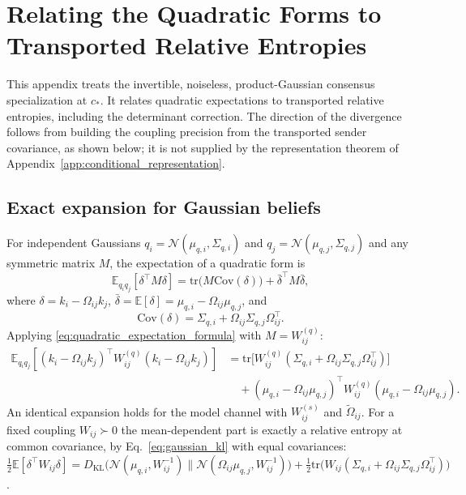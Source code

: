 \section{Relating the Quadratic Forms to Transported Relative Entropies}
This appendix treats the invertible, noiseless, product-Gaussian consensus specialization at $c_*$. It relates quadratic expectations to transported relative entropies, including the determinant correction. The direction of the divergence follows from building the coupling precision from the transported sender covariance, as shown below; it is not supplied by the representation theorem of Appendix~\ref{app:conditional_representation}.
\subsection{Exact expansion for Gaussian beliefs}
For independent Gaussians $q_i = \mathcal{N}(\mu_{q,i},\Sigma_{q,i})$ and $q_j = \mathcal{N}(\mu_{q,j},\Sigma_{q,j})$ and any symmetric matrix $M$, the expectation of a quadratic form is
\begin{equation}
\mathbb{E}_{q_i q_j}[\delta^\top M \delta]
= \mathrm{tr}\big(M\mathrm{Cov}(\delta)\big)
+ \bar{\delta}^\top M \bar{\delta},
\label{eq:quadratic_expectation_formula}
\end{equation}
where $\delta = k_i - \Omega_{ij}k_j$, $\bar{\delta} = \mathbb{E}[\delta] = \mu_{q,i} - \Omega_{ij}\mu_{q,j}$, and
\begin{equation}
\mathrm{Cov}(\delta) = \Sigma_{q,i} + \Omega_{ij}\Sigma_{q,j}\Omega_{ij}^\top.
\end{equation}
Applying \eqref{eq:quadratic_expectation_formula} with $M = W^{(q)}_{ij}$:
\begin{equation}
\begin{aligned}
\mathbb{E}_{q_i q_j}
[(k_i-\Omega_{ij}k_j)^\top W^{(q)}_{ij}(k_i-\Omega_{ij}k_j)]
&=\mathrm{tr}\big[W^{(q)}_{ij}(\Sigma_{q,i}+\Omega_{ij}\Sigma_{q,j}\Omega_{ij}^\top)\big]\\
&\quad+(\mu_{q,i}-\Omega_{ij}\mu_{q,j})^\top
W^{(q)}_{ij}
(\mu_{q,i}-\Omega_{ij}\mu_{q,j}).
\end{aligned}
\label{eq:belief_quadratic_expansion}
\end{equation}
An identical expansion holds for the model channel with $W^{(s)}_{ij}$ and $\tilde{\Omega}_{ij}$. For a fixed coupling $W_{ij} \succ 0$ the mean-dependent part is exactly a relative entropy at common covariance, by Eq.~\eqref{eq:gaussian_kl} with equal covariances: $\tfrac{1}{2}\mathbb{E}[\delta^\top W_{ij}\delta] = D_{\mathrm{KL}}\big(\mathcal{N}(\mu_{q,i}, W_{ij}^{-1})\|\mathcal{N}(\Omega_{ij}\mu_{q,j}, W_{ij}^{-1})\big) + \tfrac{1}{2}\mathrm{tr}\big(W_{ij}(\Sigma_{q,i} + \Omega_{ij}\Sigma_{q,j}\Omega_{ij}^\top)\big)$.


